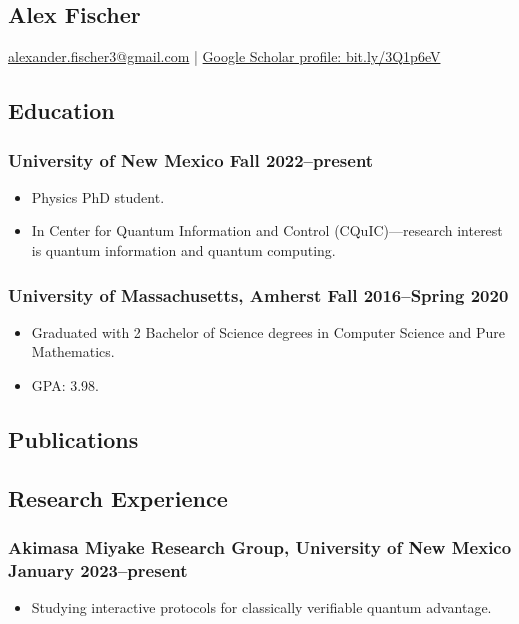 \documentclass{article}
\begin{document}
	\begin{center}
		\section*{Alex Fischer}
			\href{mailto:alexander.fischer3@gmail.com}{alexander.fischer3@gmail.com} | \href{https://scholar.google.com/citations?user=CfhWaI4AAAAJ&hl=en}{Google Scholar profile: bit.ly/3Q1p6eV}
    \end{center}
	\subsection*{Education}
		\subsubsection*{University of New Mexico \hfill \normalfont \normalsize Fall 2022--present}
			\begin{itemize}[leftmargin=40pt]
				\item Physics PhD student.
				\item In Center for Quantum Information and Control (CQuIC)---research interest is quantum information and quantum computing.
			\end{itemize}
		\subsubsection*{University of Massachusetts, Amherst \hfill \normalfont \normalsize Fall 2016--Spring 2020}
			\begin{itemize}[leftmargin=40pt]
				\item Graduated with 2 Bachelor of Science degrees in Computer Science and Pure Mathematics.
				\item GPA: 3.98.
			\end{itemize}
	\subsection*{Publications}
		\nocite{*}
		
		{}
	\subsection*{Research Experience}
		\subsubsection*{Akimasa Miyake Research Group, University of New Mexico \hfill \normalfont \normalsize January 2023--present}
			\begin{itemize}[leftmargin=40pt]
				\item Studying interactive protocols for classically verifiable quantum advantage.
			\end{itemize}
\end{document}
